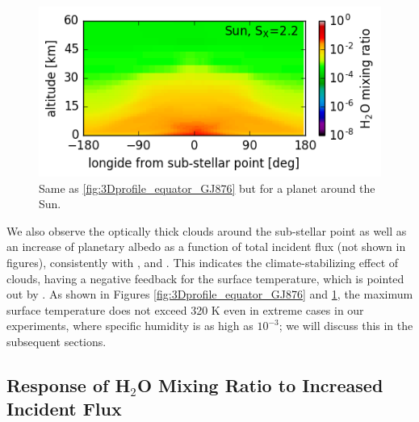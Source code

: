 \documentclass[11pt,numberedappendix,twocolappendix,]{emulateapj}
\def\water{H$_2$O }
\begin{document}
\begin{figure}[!hbt]
\begin{minipage}{0.48\hsize}
\begin{center}
    \end{center}
 \end{minipage}
   \begin{minipage}{0.48\hsize}
    \begin{center}
\includegraphics[width=\hsize]{fig/ANN0006-0012aijlAqOH0TLS_SunS22P202L40Q_xH2O.png}
    \end{center}
 \end{minipage}
    \caption{Same as \ref{fig:3Dprofile_equator_GJ876} but for a planet around the Sun.}
\label{fig:3Dprofile_equator_Sun}
\end{figure}

We also observe the optically thick clouds around the sub-stellar point as well as an increase of planetary albedo as a function of total incident flux (not shown in figures), consistently with \citet{Yang2013,Yang2014}, and \citet{Way2016}. 
This indicates the climate-stabilizing effect of clouds, having a negative feedback for the surface temperature, which is pointed out by \citet{Yang2013}. 
As shown in Figures \ref{fig:3Dprofile_equator_GJ876} and \ref{fig:3Dprofile_equator_Sun}, the maximum surface temperature does not exceed 320 K even in extreme cases in our experiments, where specific humidity is as high as $10^{-3}$; we will discuss this in the subsequent sections. 


\subsection{Response of \water Mixing Ratio to Increased Incident Flux}
\label{ss:result_H2Omixingratio}
\end{document}
